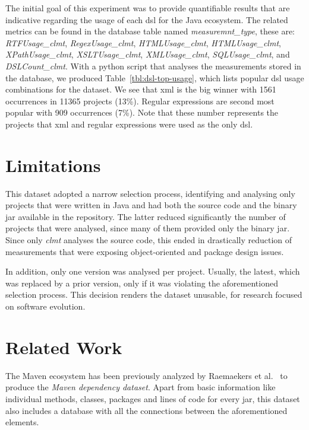 \documentclass{sig-alternate}
\begin{document}
The initial goal of this experiment was to provide quantifiable results that are indicative regarding the usage of each {\sc dsl} for the Java ecosystem. The related metrics can be found in the database table named \textit{measuremnt\_type}, these are: \textit{RTFUsage\_clmt}, \textit{RegexUsage\_clmt},
\textit{HTMLUsage\_clmt}, \textit{HTMLUsage\_clmt}, \textit{XPathUsage\_clmt}, \textit{XSLTUsage\_clmt}, \textit{XMLUsage\_clmt}, \textit{SQLUsage\_clmt}, and \textit{DSLCount\_clmt}. With a python script that analyses the measurements stored in the database, we produced Table~\ref{tbl:dsl-top-usage}, which lists popular {\sc dsl} usage combinations for the dataset. We see that {\sc xml} is the big winner with 1561 occurrences in 11365 projects (13\%). Regular expressions are second most popular with 909 occurrences (7\%). Note that these number represents the projects that {\sc xml} and regular expressions were used as the only {\sc dsl}.

\section{Limitations}
\label{sec:limit}

This dataset adopted a narrow selection process, identifying and analysing only projects that were written in Java and had both the source code and the binary {\sc jar} available in the repository. The latter reduced significantly the number of projects that were analysed, since many of them provided only the binary {\sc jar}. Since only \textit{clmt} analyses the source code, this ended in drastically reduction of measurements that were exposing object-oriented and package design issues.

In addition, only one version was analysed per project. Usually, the latest, which was replaced by a prior version, only if it was violating the aforementioned selection process. This decision renders the dataset unusable, for research focused on software evolution.

\section{Related Work}
\label{sec:rel}

The Maven ecosystem has been previously analyzed by Raemaekers et al.~\cite{RDV13} to produce the {\it Maven dependency dataset}. Apart from basic information like individual methods, classes, packages and lines of code for every {\sc jar}, this dataset also includes a database with all the connections between the aforementioned elements.
\end{document}
